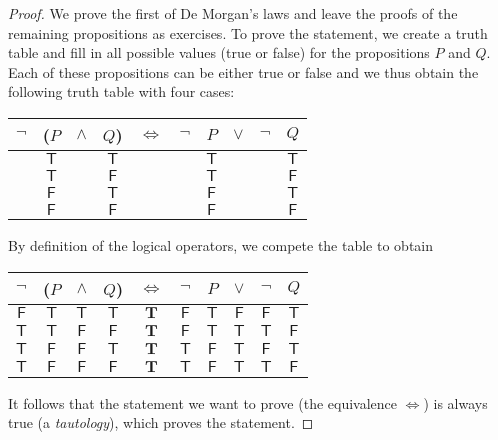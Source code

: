 \documentclass{tstextbook}
\begin{document}
    \begin{proof}
        \newcommand{\T}{\mathsf{T}}
        \newcommand{\TT}{\mathbf{T}}
        \renewcommand{\F}{\mathsf{F}}
        We prove the first of De Morgan's laws and leave the proofs of
        the remaining propositions as exercises. To prove the statement,
        we create a truth table and fill in all possible values (true or
        false) for the propositions $P$ and $Q$. Each of these propositions
        can be either true or false and we thus obtain the following truth
        table with four cases:
        \begin{center}
            \begin{tabular}{cccccccccc}
                $\lnot$ & ($P$ & $\land$ & $Q$) & $\Leftrightarrow$ & $\lnot$ & $P$  & $\lor$ & $\lnot$ & $Q$  \\
                \midrule
                & $\T$ &         & $\T$ &                   &         & $\T$ &        &         & $\T$ \\
                & $\T$ &         & $\F$ &                   &         & $\T$ &        &         & $\F$ \\
                & $\F$ &         & $\T$ &                   &         & $\F$ &        &         & $\T$ \\
                & $\F$ &         & $\F$ &                   &         & $\F$ &        &         & $\F$
            \end{tabular}
        \end{center}
        By definition of the logical operators, we compete the table to obtain
        \begin{center}
            \begin{tabular}{cccccccccc}
                $\lnot$ & ($P$ & $\land$ & $Q$) & $\Leftrightarrow$ & $\lnot$ & $P$  & $\lor$ & $\lnot$ & $Q$  \\
                \midrule
                $\F$    & $\T$ & $\T$    & $\T$ & $\TT$             & $\F$    & $\T$ & $\F$   & $\F$    & $\T$ \\
                $\T$    & $\T$ & $\F$    & $\F$ & $\TT$             & $\F$    & $\T$ & $\T$   & $\T$    & $\F$ \\
                $\T$    & $\F$ & $\F$    & $\T$ & $\TT$             & $\T$    & $\F$ & $\T$   & $\F$    & $\T$ \\
                $\T$    & $\F$ & $\F$    & $\F$ & $\TT$             & $\T$    & $\F$ & $\T$   & $\T$    & $\F$
            \end{tabular}
        \end{center}
        It follows that the statement we want to prove (the equivalence $\Leftrightarrow$)
        is always true (a \emph{tautology}), which proves the statement.
    \end{proof}
\end{document}
